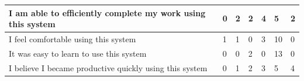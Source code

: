 \begin{center}
{\begin{tabular}{|l|l|l|l|l|l|l|}
I am able to efficiently complete my work using this system                                               & 0                                                            & 2        & 2       & 4     & 5                                                         & 2                                                         \\ \hline
I feel comfortable using this system                                                                      & 1                                                            & 1        & 0       & 3     & 10                                                        & 0                                                         \\ \hline
It was easy to learn to use this system                                                                   & 0                                                            & 0        & 2       & 0     & 13                                                        & 0                                                         \\ \hline
I believe I became productive quickly using this system                                                   & 0                                                            & 1        & 2       & 3     & 5                                                         & 4                                                         \\ \hline
\end{tabular}
}
\end{center}
\vspace{1cm}



